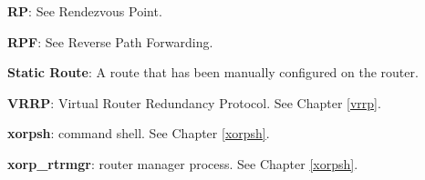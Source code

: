 \begin{description}
  \item{\bf RP}: See Rendezvous Point.

  \item{\bf RPF}: See Reverse Path Forwarding.

  \item{\bf Static Route}: A route that has been manually configured on
  the router.

  \item{\bf VRRP}: Virtual Router Redundancy Protocol.  See Chapter \ref{vrrp}.

  \item{\bf xorpsh}: \xorp command shell.  See Chapter \ref{xorpsh}.

  \item{\bf xorp\_rtrmgr}: \xorp router manager process.  See Chapter
  \ref{xorpsh}.

\end{description}
